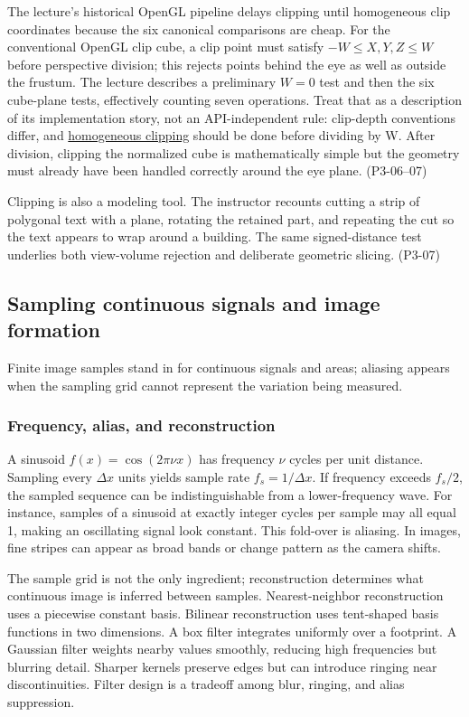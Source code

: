 The lecture's historical OpenGL pipeline delays clipping until homogeneous clip coordinates because the six canonical comparisons are cheap. For the conventional OpenGL clip cube, a clip point must satisfy \(-W\le X,Y,Z\le W\) before perspective division; this rejects points behind the eye as well as outside the frustum. The lecture describes a preliminary \(W=0\) test and then the six cube-plane tests, effectively counting seven operations. Treat that as a description of its implementation story, not an API-independent rule: clip-depth conventions differ, and \hyperref[appendix-40426e4b2103]{homogeneous clipping} should be done before dividing by W. After division, clipping the normalized cube is mathematically simple but the geometry must already have been handled correctly around the eye plane. (P3-06--07)

Clipping is also a modeling tool. The instructor recounts cutting a strip of polygonal text with a plane, rotating the retained part, and repeating the cut so the text appears to wrap around a building. The same signed-distance test underlies both view-volume rejection and deliberate geometric slicing. (P3-07)

\subsection{Sampling continuous signals and image formation}\label{sampling-continuous-signals-and-image-formation}

Finite image samples stand in for continuous signals and areas; aliasing appears when the sampling grid cannot represent the variation being measured.

\subsubsection{Frequency, alias, and reconstruction}\label{frequency-alias-and-reconstruction}

A sinusoid \(f(x)=\cos(2\pi \nu x)\) has frequency \(\nu\) cycles per unit distance. Sampling every \(\Delta x\) units yields sample rate \(f_s=1/\Delta x\). If frequency exceeds \(f_s/2\), the sampled sequence can be indistinguishable from a lower-frequency wave. For instance, samples of a sinusoid at exactly integer cycles per sample may all equal 1, making an oscillating signal look constant. This fold-over is aliasing. In images, fine stripes can appear as broad bands or change pattern as the camera shifts.

The sample grid is not the only ingredient; reconstruction determines what continuous image is inferred between samples. Nearest-neighbor reconstruction uses a piecewise constant basis. Bilinear reconstruction uses tent-shaped basis functions in two dimensions. A box filter integrates uniformly over a footprint. A Gaussian filter weights nearby values smoothly, reducing high frequencies but blurring detail. Sharper kernels preserve edges but can introduce ringing near discontinuities. Filter design is a tradeoff among blur, ringing, and alias suppression.

